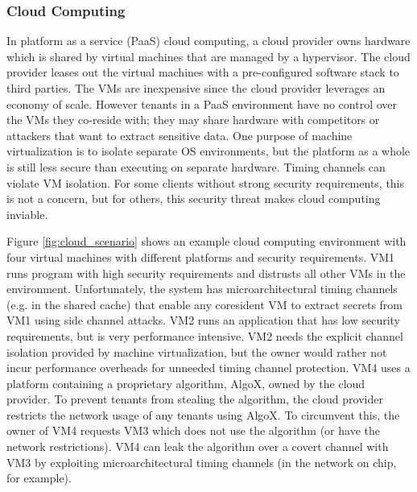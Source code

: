 \subsubsection{Cloud Computing}
In platform as a service (PaaS) cloud computing, a cloud provider owns hardware 
which is shared by virtual machines that are managed by a hypervisor. The cloud 
provider leases out the virtual machines with a pre-configured software stack 
to third parties. The VMs are inexpensive since the cloud provider leverages an 
economy of scale.
However tenants in a PaaS environment have no control over the VMs they 
co-reside with; they may share hardware with competitors or attackers that want 
to extract sensitive data. One purpose of machine virtualization is to isolate 
separate OS environments, but the platform as a whole is still less secure than 
executing on separate hardware. Timing channels can violate VM isolation.
For some clients without strong security requirements, this is not a concern, 
but for others, this security threat makes cloud computing inviable.

Figure \ref{fig:cloud_scenario} shows an example cloud computing environment 
with four virtual machines with different platforms and security requirements.
VM1 runs program with high security requirements and distrusts all other VMs in 
the environment. Unfortunately, the system has microarchitectural timing 
channels (e.g. in the shared cache) that enable any coresident VM to extract 
secrets from VM1 using side channel attacks. VM2 runs an application that has 
low security requirements, but is very performance intensive. VM2 needs the 
explicit channel isolation provided by machine virtualization, but the owner 
would rather not incur performance overheads for unneeded timing channel 
protection. VM4 uses a platform containing a proprietary algorithm, AlgoX, 
owned by the cloud provider. To prevent tenants from stealing the algorithm, 
the cloud provider restricts the network usage of any tenants using AlgoX. To 
circumvent this, the owner of VM4 requests VM3 which does not use the algorithm 
(or have the network restrictions). VM4 can leak the algorithm over a covert 
channel with VM3 by exploiting microarchitectural timing channels (in the 
network on chip, for example).

